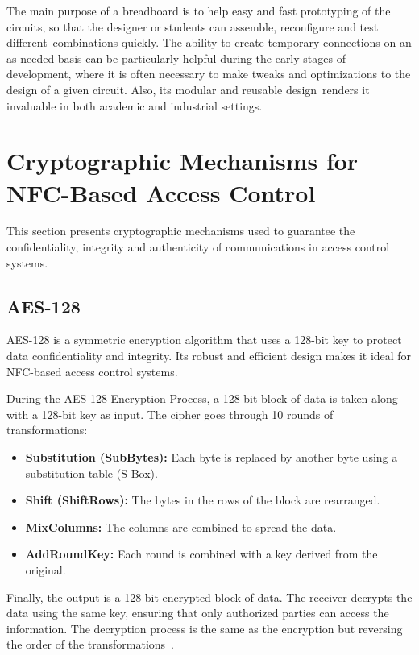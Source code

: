 The main purpose of a breadboard is to help easy and fast prototyping of the circuits,
so that the designer or students can assemble, reconfigure and test
different combinations quickly. The ability to create temporary connections on an
as-needed basis can be particularly helpful during the early stages of development,
where it is often necessary to make tweaks and optimizations to the design of a
given circuit. Also, its modular and reusable design renders it invaluable in both
academic and industrial settings.




\clearpage

\section{Cryptographic Mechanisms for NFC-Based Access Control}
\label{sec:crypto_mechs}
This section presents cryptographic mechanisms used to guarantee the confidentiality, integrity and authenticity of communications in access control systems.


\subsection{AES-128}
\label{subsec:aes128}

AES-128 is a symmetric encryption algorithm that uses a 128-bit key to protect data confidentiality and integrity. Its robust and efficient design makes it ideal for NFC-based access control systems.

During the AES-128 Encryption Process, a 128-bit block of data is taken along with a 128-bit key as input. The cipher goes through 10 rounds of transformations:

\begin{itemize}
	\item \textbf{Substitution (SubBytes):} Each byte is replaced by another byte using a substitution table (S-Box).
	\item \textbf{Shift (ShiftRows):} The bytes in the rows of the block are rearranged.
	\item \textbf{MixColumns:} The columns are combined to spread the data.
	\item \textbf{AddRoundKey:} Each round is combined with a key derived from the original.
\end{itemize}

Finally, the output is a 128-bit encrypted block of data. The receiver decrypts the data using the same key, ensuring that only authorized parties can access the information. The decryption process is the same as the encryption but reversing the order of the transformations~\cite{Ref12}.

